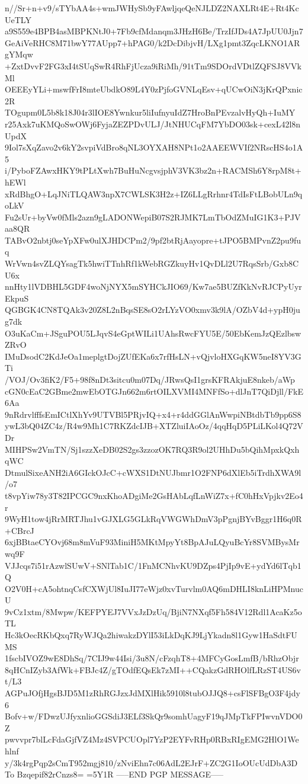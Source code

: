 n//Sr+n+v9/sTYbAA4s+wmJWHySb9yFAwljqeQeNJLDZ2NAXLRt4E+Rt4KcUeTLY
a9S559e4BPB4asMBPKNtJ0+7Fb9cfMdanqm3JHzH6Be/TrzIfJDs4A7JpUU0Jjn7
GeAiVeRHC8M71bwY77AUpp7+hPAG0/k2DcDibjvH/LXg1pmt3ZqcLKNO1ARgYMqw
+ZxtDvvF2FG3xI4tSUqSwR4RhFjUcza9iRiMh/91tTm9SDOrdVDtlZQFSJ8VVkMl
OEEEyYLi+mswfFrI8mteUbdkO89L4Y0zPjfoGVNLqEsv+qUCwOiN3jKrQPxnic2R
TOgupm0L5b8k18J04r3lIOE8Ywnkur5liIufnyuIdZ7HroBnPEvzalvHyQh+IuMY
r25Axk7uKMQoSwOWj6FyjaZEZPDvULJ/JtNHUCqFM7YbDO03sk+cexL42l8nUpdX
9Iol7sXqZavo2v6kY2svpiVdBro8qNL3OYXAH8NPt1o2AAEEWVIf2NRscHS4o1A5
i/PyboFZAwxHKY9tPLtXwh7BuHuNcgvsjphV3VK3bz2n+RACMSh6Y8rpM8t+hEWl
xRdBhgO+LqJNiTLQAW3npX7CWLSK3H2z+IZ6LLgRrhnr4TdIsFtLBobULn9qoLkV
Fu2sUr+byVw0fMls2azn9gLADONWepiB07S2RJMK7LmTbOdZMuIG1K3+PJVaa8QR
TABvO2nbtj0seYpXFw0ulXJHDCPm2/9pf2btRjAayopre+tJPO5BMPvnZ2pu9fuq
WrVwn4svZLQYsagTk5hwiTTnhRf1kWebRGZkuyHv1QvDLl2U7RqsSrb/Gxb8CU6x
nnHty1lVDBHL5GDF4woNjNYX5mSYHCkJIO69/Kw7ae5BUZfKkNvRJCPyUyrEkpuS
QGBGK4CN8TQAk3v20Z8L2nBqsSE8sO2rLYzVO0xmv3k9lA/OZbV4d+ypH0jug7dk
O3uKaCm+JSguPOU5LJqvS4eGptWILi1UAhsRwcFYU5E/50EbKemJzQEzlbswZRvO
IMuDsodC2KdJeOa1meplgtDojZUfEKa6x7rfHsLN+vQjvloHXGqKW5neI8YV3GTi
/VOJ/Ov3fiK2/F5+98f8nDt3sitcu0m07Dq/JRwsQsI1grsKFRAkjuE8nkeb/aWp
cGN0cEaC2GBme2mwEbOTGJn662m6rtOILXVMI4MNFfSo+dlJnT7QiDjll/FkE6Aa
9nRdrvlfffsEmICtlXhYv9UTVBl5PRjvIQ+x4+r4ddGGlAnWwpiNBtdbTb9pp6S8
ywL3bQ04ZC4z/R4w9Mh1C7RKZdcIJB+XTZluiIAoOz/4qqHqD5PLiLKol4Q72VDr
MIHPSw2VmTN/Sj1szzXeDB02S2gs3zzozOK7RQ3R9ol2UHhDu5bQihMpxkQxhqWC
DtmulSixeANH2iA6GIckOJcC+cWXS1DtNUJbmr1O2FNP6dXlEb5iTrdhXWA9l/o7
t8vpYiw78y3T82IPCGC9nxKhoADgiMe2GsHAbLqfLnWiZ7x+fC0hHxVpjkv2Eo4r
9WyH1tow4jRrMRTJhu1vGJXLG5GLkRqVWGWhDmV3pPgnjBYvBggr1H6q0R+CBrcJ
6xjBBtaeCYOvj68m8mVuF93MiniH5MKtMpyYt8BpAJuLQyuBcYr8SVMBysMrwq9F
VJJcqs7i51rAzwlSUwV+SNlTab1C/1FnMCNhvKU9DZps4PjIp9vE+ydYd6lTqb1Q
O2V0H+cA5ohtnqCsfCXWjUl8IuJI77eWjz0xvTurvlm0AQ6mDHLI8knLiHPMnucU
9vCz1xtm/8Mwpw/KEFPYEJ7VVxJzDzUq/BjiN7NXqf5Fh584V12Rdl1AcaKz5oTL
Hc3kOecRKbQxq7RyWJQa2hiwakzDYlI53iLkDqKJ9LjYkadn8l1Gyw1HaSdtFUMS
1fscbIVOZ9wE8DhSq/7CIJ9w44Isi/3u8N/cFzqhT8+4MFCyGosLmfB/bRhzObjr
8qHCnIZyb3AfWk+FBJc4Z/gTOdfEQsEk7zMI++CQakzGdRHOlfLRzST4US6vt/L3
AGPuJOfjHgsBJD5M1zRhRGJzxJdMXlHik5910l8tubOJJQ8+csFlSFBgO3F4jdy6
Bofv+w/FDwzUJfyxnlioGGSdiJ3ELf3SkQr9somhUagyF19qJMpTkFPIwvnVDO0Z
pwvvpr7blLcFdaGjfVZ4Mz4SVPCUOpl7YzP2EYFvRHp0RBxRIgEMG2HlO1Wehlnf
y/3k4rgPqp2sCmT952mgj810/zNviEhn7c06AdL2EJrF+ZC2G1IoOUcUdDbA3DTo
Bzqepif82rCnzs8=
=5Y1R
-----END PGP MESSAGE-----
